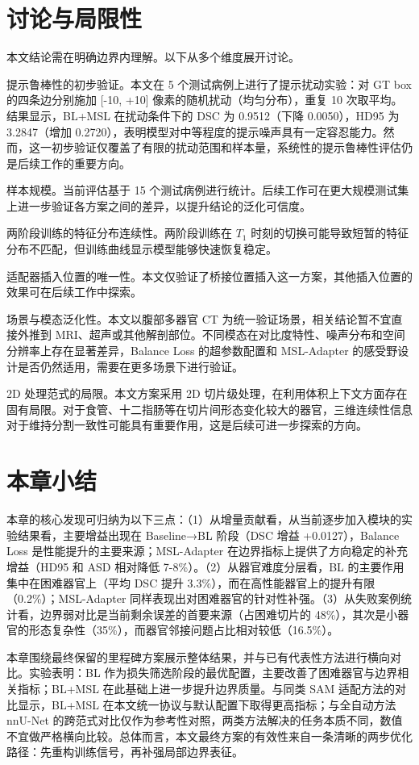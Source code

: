 \section{讨论与局限性}

本文结论需在明确边界内理解。以下从多个维度展开讨论。

提示鲁棒性的初步验证。本文在 5 个测试病例上进行了提示扰动实验：对 GT box 的四条边分别施加 [-10, +10] 像素的随机扰动（均匀分布），重复 10 次取平均。结果显示，BL+MSL 在扰动条件下的 DSC 为 0.9512（下降 0.0050），HD95 为 3.2847（增加 0.2720），表明模型对中等程度的提示噪声具有一定容忍能力。然而，这一初步验证仅覆盖了有限的扰动范围和样本量，系统性的提示鲁棒性评估仍是后续工作的重要方向。

样本规模。当前评估基于 15 个测试病例进行统计。后续工作可在更大规模测试集上进一步验证各方案之间的差异，以提升结论的泛化可信度。

两阶段训练的特征分布连续性。两阶段训练在 $T_1$ 时刻的切换可能导致短暂的特征分布不匹配，但训练曲线显示模型能够快速恢复稳定。

适配器插入位置的唯一性。本文仅验证了桥接位置插入这一方案，其他插入位置的效果可在后续工作中探索。

场景与模态泛化性。本文以腹部多器官 CT 为统一验证场景，相关结论暂不宜直接外推到 MRI、超声或其他解剖部位。不同模态在对比度特性、噪声分布和空间分辨率上存在显著差异，Balance Loss 的超参数配置和 MSL-Adapter 的感受野设计是否仍然适用，需要在更多场景下进行验证。

2D 处理范式的局限。本文方案采用 2D 切片级处理，在利用体积上下文方面存在固有局限。对于食管、十二指肠等在切片间形态变化较大的器官，三维连续性信息对于维持分割一致性可能具有重要作用，这是后续可进一步探索的方向。

\section{本章小结}

本章的核心发现可归纳为以下三点：（1）从增量贡献看，从当前逐步加入模块的实验结果看，主要增益出现在 Baseline→BL 阶段（DSC 增益 +0.0127），Balance Loss 是性能提升的主要来源；MSL-Adapter 在边界指标上提供了方向稳定的补充增益（HD95 和 ASD 相对降低 7-8\%）。（2）从器官难度分层看，BL 的主要作用集中在困难器官上（平均 DSC 提升 3.3\%），而在高性能器官上的提升有限（0.2\%）；MSL-Adapter 同样表现出对困难器官的针对性补强。（3）从失败案例统计看，边界弱对比是当前剩余误差的首要来源（占困难切片的 48\%），其次是小器官的形态复杂性（35\%），而器官邻接问题占比相对较低（16.5\%）。

本章围绕最终保留的里程碑方案展示整体结果，并与已有代表性方法进行横向对比。实验表明：BL 作为损失筛选阶段的最优配置，主要改善了困难器官与边界相关指标；BL+MSL 在此基础上进一步提升边界质量。与同类 SAM 适配方法的对比显示，BL+MSL 在本文统一协议与默认配置下取得更高指标；与全自动方法 nnU-Net 的跨范式对比仅作为参考性对照，两类方法解决的任务本质不同，数值不宜做严格横向比较。总体而言，本文最终方案的有效性来自一条清晰的两步优化路径：先重构训练信号，再补强局部边界表征。
